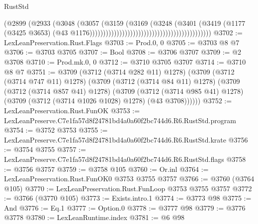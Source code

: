 \begin{lexlean}{RustStd}
\begin{coremodule}
                                                                        (@2899
                                                                          (@2933
                                                                            (@3048
                                                                              (@3057
                                                                                (@3159
                                                                                  (@3169
                                                                                    (@3248
                                                                                      (@3401
                                                                                        (@3419
                                                                                          (@1177
                                                                                            (@3425
                                                                                              @3653)
                                                                                            (@43
                                                                                              @1176)))))))))))))))))))))))))))))))))))))))))))))
@3702 := LexLeanPreservation.Rust.Flags
@3703 := Prod.{0, 0}
@3705 := @3703 @8 @7
@3706 := @3703 @3705
@3707 := Bool
@3708 := @3706 @3707
@3709 := @2 @3708
@3710 := Prod.mk.{0, 0}
@3712 := @3710 @3705 @3707
@3714 := @3710 @8 @7
@3751 := @3709
    (@3712 (@3714 @282 @11) @1278)
    (@3709
      (@3712 (@3714 @747 @11) @1278)
      (@3709
        (@3712 (@3714 @84 @11) @1278)
        (@3709
          (@3712 (@3714 @857 @41) @1278)
          (@3709
            (@3712 (@3714 @985 @41) @1278)
            (@3709 (@3712 (@3714 @1026 @1028) @1278) (@43 @3708))))))
@3752 := LexLeanPreservation.Rust.FunOK
@3753 := LexLeanPreserve.C7e1fa57d8f24781bd4a0a60f2bc744d6.R6.RustStd.program
@3754 := @3752 @3753
@3755 := LexLeanPreserve.C7e1fa57d8f24781bd4a0a60f2bc744d6.R6.RustStd.krate
@3756 := @3754 @3755
@3757 := LexLeanPreserve.C7e1fa57d8f24781bd4a0a60f2bc744d6.R6.RustStd.flags
@3758 := @3756 @3757
@3759 := @3758 @105
@3760 := Or.inl
@3764 := LexLeanPreservation.Rust.FunOK0 @3753 @3755 @3757
@3766 := @3760 (@3764 @105)
@3770 := LexLeanPreservation.Rust.FunLoop @3753 @3755 @3757
@3772 := @3766 (@3770 @105)
@3773 := Exists.intro.{1}
@3774 := @3773 @98
@3775 := And
@3776 := Eq.{1}
@3777 := Option.{0}
@3778 := @3777 @98
@3779 := @3776 @3778
@3780 := LexLeanRuntime.index
@3781 := @6 @98

\end{coremodule}
\end{lexlean}
